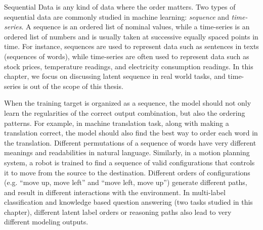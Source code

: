 Sequential Data is any kind of data where the order matters. Two types of sequential data are commonly studied in machine learning: \textit{sequence} and \textit{time-series}. A sequence is an ordered list of nominal values, while a time-series is an ordered list of numbers and is usually taken at successive equally spaced points in time. For instance, sequences are used to represent data such as sentences in texts (sequences of words), while time-series are often used to represent data such as stock prices, temperature readings, and electricity consumption readings. In this chapter, we focus on discussing latent sequence in real world tasks, and time-series is out of the scope of this thesis.

When the training target is organized as a sequence, the model should not only learn the regularities of the correct output combination, but also the ordering patterns. For example, in machine translation task, along with making a translation correct, the model should also find the best way to order each word in the translation. Different permutations of a sequence of words have very different meanings and readabilities in natural language. Similarly, in a motion planning system, a robot is trained to find a sequence of valid configurations that controls it to move from the source to the destination. Different orders of configurations (e.g. ``move up, move left'' and ``move left, move up'') generate different paths, and result in different interactions with the environment. In multi-label classification and knowledge based question answering (two tasks studied in this chapter), different latent label orders or reasoning paths also lead to very different modeling outputs.

